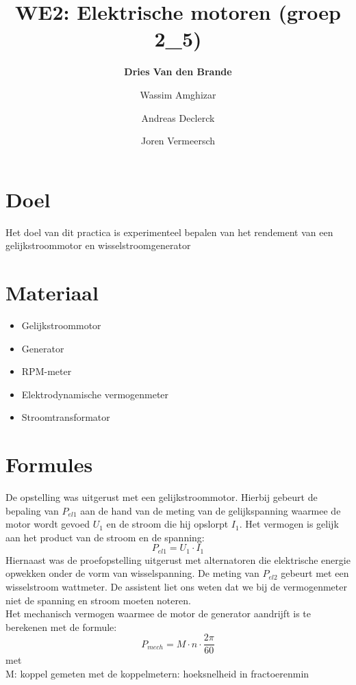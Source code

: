 \documentclass[12pt]{article}
\title{WE2: Elektrische motoren (groep 2\_5)}
\author{\textbf{Dries Van den Brande} \and Wassim Amghizar 
\and Andreas Declerck \and Joren Vermeersch}
\begin{document}
\maketitle

\section{Doel}
Het doel van dit practica is experimenteel bepalen van het rendement
van een gelijkstroommotor en wisselstroomgenerator

\section{Materiaal}
\begin{itemize}
    \item Gelijkstroommotor
    \item Generator
    \item RPM-meter
    \item Elektrodynamische vermogenmeter
    \item Stroomtransformator
\end{itemize}

\section{Formules}
De opstelling was uitgerust met een gelijkstroommotor. Hierbij gebeurt de bepaling van $P_{el1}$
aan de hand van de meting van de gelijkspanning waarmee de motor wordt gevoed $U_1$ en de stroom 
die hij opslorpt $I_1$. Het vermogen is gelijk aan het product van de stroom en de spanning:
\begin{equation}
    P_{el1} = U_1 \cdot I_1
\end{equation}
Hiernaast was de proefopstelling uitgerust met alternatoren die 
elektrische energie opwekken onder de vorm van wisselspanning. De meting van $P_{el2}$
gebeurt met een wisselstroom wattmeter. De assistent liet ons weten dat we bij de vermogenmeter
niet de spanning en stroom moeten noteren.\\

\noindent Het mechanisch vermogen waarmee de motor de generator aandrijft is te berekenen
met de formule: 
\begin{equation}
    P_{mech} = M \cdot n \cdot \frac{2\pi}{60}
\end{equation} 
met \\
M: koppel gemeten met de koppelmetern: hoeksnelheid in frac{toeren}{min}
\end{document}
